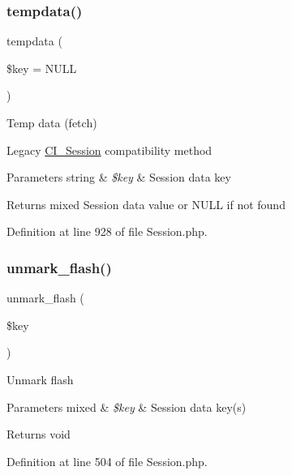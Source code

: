 \subsubsection{\texorpdfstring{tempdata()}{tempdata()}}
{\footnotesize\ttfamily tempdata (\begin{DoxyParamCaption}\item[{}]{\$key = {\ttfamily NULL} }\end{DoxyParamCaption})}

Temp data (fetch)

Legacy \mbox{\hyperlink{class_c_i___session}{C\+I\+\_\+\+Session}} compatibility method


\begin{DoxyParams}[1]{Parameters}
string & {\em \$key} & Session data key \\
\hline
\end{DoxyParams}
\begin{DoxyReturn}{Returns}
mixed Session data value or N\+U\+LL if not found 
\end{DoxyReturn}


Definition at line 928 of file Session.\+php.

\mbox{\label{class_c_i___session_a8e89303bfdff75a20528986c2bcdba86}} 
\subsubsection{\texorpdfstring{unmark\_flash()}{unmark\_flash()}}
{\footnotesize\ttfamily unmark\+\_\+flash (\begin{DoxyParamCaption}\item[{}]{\$key }\end{DoxyParamCaption})}

Unmark flash


\begin{DoxyParams}[1]{Parameters}
mixed & {\em \$key} & Session data key(s) \\
\hline
\end{DoxyParams}
\begin{DoxyReturn}{Returns}
void 
\end{DoxyReturn}


Definition at line 504 of file Session.\+php.

\mbox{\label{class_c_i___session_a602eaf2b4a6936ed9bb8750892fac551}} 
